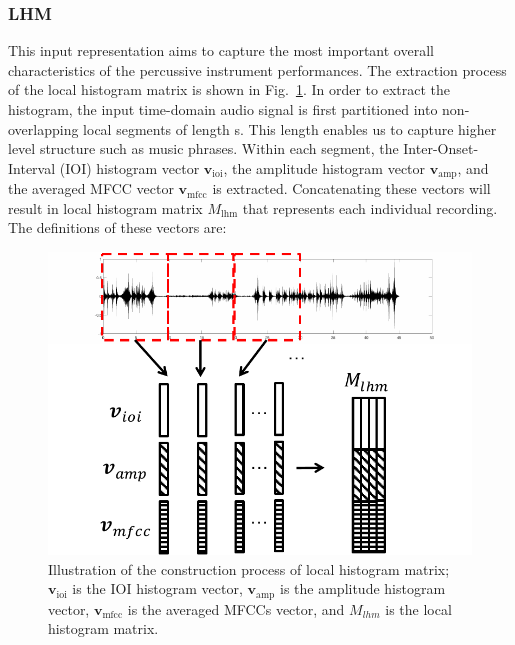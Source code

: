 \documentclass{ws-ijsc}
\begin{document}
\subsubsection{LHM}
This input representation aims to capture the most important overall characteristics of the percussive instrument performances. The extraction process of the local histogram matrix is shown in Fig.~\ref{fig:hist_mat}. In order to extract the histogram, the input time-domain audio signal is first partitioned into non-overlapping local segments of length \unit[10]{s}. This length enables us to capture higher level structure such as music phrases. Within each segment, the Inter-Onset-Interval (IOI) histogram vector $\mathbf{v}_\mathrm{ioi}$, the amplitude histogram vector $\mathbf{v}_\mathrm{amp}$, and the averaged MFCC vector $\mathbf{v}_\mathrm{mfcc}$ is extracted.
Concatenating these vectors will result in local histogram matrix $M_\mathrm{lhm}$ that represents each individual recording. The definitions of these vectors are:
\begin{figure}
    \centering
    \includegraphics[width = 8 cm]{./figs/hist_mat.pdf}
    \caption{Illustration of the construction process of local histogram matrix; $\mathbf{v}_\mathrm{ioi}$ is the IOI histogram vector, $\mathbf{v}_\mathrm{amp}$ is the amplitude histogram vector, $\mathbf{v}_\mathrm{mfcc}$ is the averaged MFCCs vector, and $M_{lhm}$ is the local histogram matrix.}
    \label{fig:hist_mat}
\end{figure}
\end{document}
